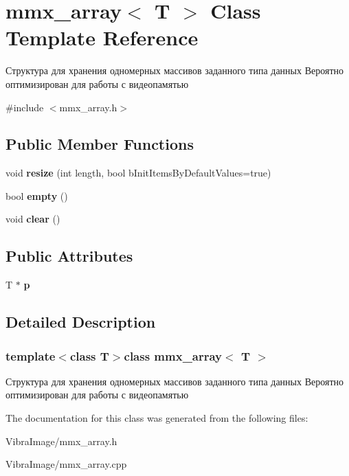 \hypertarget{classmmx__array}{\section{mmx\+\_\+array$<$ T $>$ Class Template Reference}
\label{classmmx__array}
}


Структура для хранения одномерных массивов заданного типа данных Вероятно оптимизирован для работы с видеопамятью  




{\ttfamily \#include $<$mmx\+\_\+array.\+h$>$}

\subsection*{Public Member Functions}
\begin{DoxyCompactItemize}
\item 
\hypertarget{classmmx__array_a1e2391d51dfe090e9bd0a9bd5368d512}{void {\bfseries resize} (int length, bool b\+Init\+Items\+By\+Default\+Values=true)}\label{classmmx__array_a1e2391d51dfe090e9bd0a9bd5368d512}

\item 
\hypertarget{classmmx__array_ad16d7bd1ebebc364a791f011d2d5f9d1}{bool {\bfseries empty} ()}\label{classmmx__array_ad16d7bd1ebebc364a791f011d2d5f9d1}

\item 
\hypertarget{classmmx__array_a5da7e05a539fbfb916289d32ae540a9e}{void {\bfseries clear} ()}\label{classmmx__array_a5da7e05a539fbfb916289d32ae540a9e}

\end{DoxyCompactItemize}
\subsection*{Public Attributes}
\begin{DoxyCompactItemize}
\item 
\hypertarget{classmmx__array_ad960c2e84c1717258f9c9527b0d339b2}{T $\ast$ {\bfseries p}}\label{classmmx__array_ad960c2e84c1717258f9c9527b0d339b2}

\end{DoxyCompactItemize}


\subsection{Detailed Description}
\subsubsection*{template$<$class T$>$class mmx\+\_\+array$<$ T $>$}

Структура для хранения одномерных массивов заданного типа данных Вероятно оптимизирован для работы с видеопамятью 



The documentation for this class was generated from the following files\+:\begin{DoxyCompactItemize}
\item 
Vibra\+Image/mmx\+\_\+array.\+h\item 
Vibra\+Image/mmx\+\_\+array.\+cpp\end{DoxyCompactItemize}
